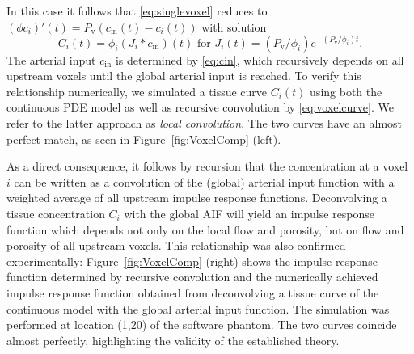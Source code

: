 \documentclass[journal,twocolumn]{IEEEtran}
\newcommand{\ca}{c_\mathrm{a}}
\newcommand{\Perfv}{P_{\mathrm{v}}}
\begin{document}
	In this case it follows that \eqref{eq:singlevoxel} reduces to $(\phi c_i)'(t) = \Perfv (c_\mathrm{in}(t) - c_i(t))$ 
	with solution
	\begin{equation}\label{eq:voxelcurve}
		C_i(t) = \phi_i(J_i*c_{\mathrm{in}})(t)
			\text{ for } J_i(t)=(\Perfv/\phi_i)e^{- (\Perfv/\phi_i)t}.
	\end{equation}
	The arterial input $c_{\mathrm{in}}$ is determined by \eqref{eq:cin}, which recursively depends on all upstream voxels until the global arterial input is reached.
	To verify this relationship numerically, we simulated a tissue curve $C_i(t)$ using both the continuous PDE model as well as recursive convolution by \eqref{eq:voxelcurve}.
	We refer to the latter approach as \textit{local convolution}. The two curves have an almost perfect match, as seen in Figure~\ref{fig:VoxelComp} (left).	

	As a direct consequence, it follows by recursion that the concentration at a voxel $i$ can be written as a convolution of the (global) arterial input function with a weighted average of all upstream impulse response functions.
	Deconvolving a tissue concentration $C_i$ with the global AIF will yield an impulse response function which depends not only on the local flow and porosity, but on flow and porosity of all upstream voxels.
	This relationship was also confirmed experimentally: Figure~\ref{fig:VoxelComp} (right) shows the impulse response function determined by recursive convolution and the numerically achieved impulse response function obtained from deconvolving a tissue curve of the continuous model with the global arterial input function. 
	The simulation was performed at location (1,20) of the software phantom.
	The two curves coincide almost perfectly, highlighting the validity of the established theory.
\end{document}
